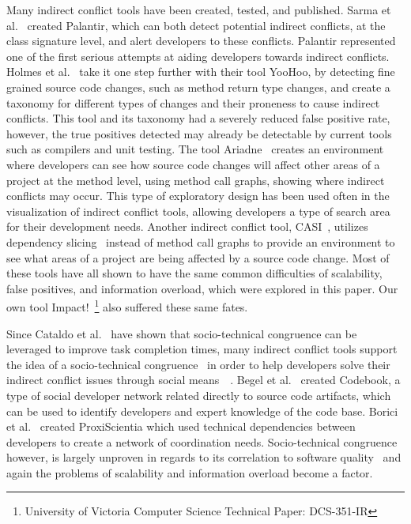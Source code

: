 \documentclass[conference]{IEEEtran}
\begin{document}
Many indirect conflict tools have been created, tested, and published. Sarma et al.~\cite{Sarma:2007:TSA} created Palantir, 
which can both detect potential indirect conflicts, at the class signature level, and alert developers to these conflicts. 
Palantir represented one of the first serious attempts at aiding developers towards indirect conflicts. Holmes et 
al.~\cite{Holmes:2010:CAR} take it one step further with their tool YooHoo, by detecting fine grained source code changes, 
such as method return type changes, and create a taxonomy for different types of changes and their proneness to cause 
indirect conflicts. This tool and its taxonomy had a severely reduced false positive rate, however, the true positives 
detected may already be detectable by current tools such as compilers and unit testing. The tool Ariadne~\cite{Trainer:2005:BGT} 
creates an environment where developers can see how source code changes will affect other areas of a project at the 
method level, using method call graphs, showing where indirect conflicts may occur. This type of exploratory design has 
been used often in the visualization of indirect conflict tools, allowing developers a type of search area for their development
needs. Another indirect conflict tool, CASI~\cite{Servant:2010:CPI}, utilizes dependency slicing~\cite{Bajracharya:2009:SIS} 
instead of method call graphs to provide an environment to see what areas of a project are being affected by a source code change. 
Most of these tools have all shown to have the same common difficulties of scalability, false positives, and information overload, 
which were explored in this paper. Our own tool 
Impact!~\footnote{University of Victoria Computer Science Technical Paper: DCS-351-IR} also suffered these same fates.

Since Cataldo et al.~\cite{Cataldo:2006:ICR} have shown that socio-technical congruence can be leveraged to improve task completion
times, many indirect conflict tools support the idea of a socio-technical congruence~\cite{Kwan:2011:ESC} in order to help
developers solve their indirect conflict issues through social means~\cite{Begel:2010:CDE}~\cite{Borici:2012:CHA}. 
Begel et al.~\cite{Begel:2010:CDE} created Codebook, a type of social developer network related directly to source code
artifacts, which can be used to identify developers and expert knowledge of the code base. Borici et al.~\cite{Borici:2012:CHA}
created ProxiScientia which used technical dependencies between developers to create a network of coordination needs.
Socio-technical congruence however, is largely unproven in regards to its correlation to
software quality~\cite{Kwan:2011:SCE} and again the problems of scalability and information overload become a factor.
\end{document}
